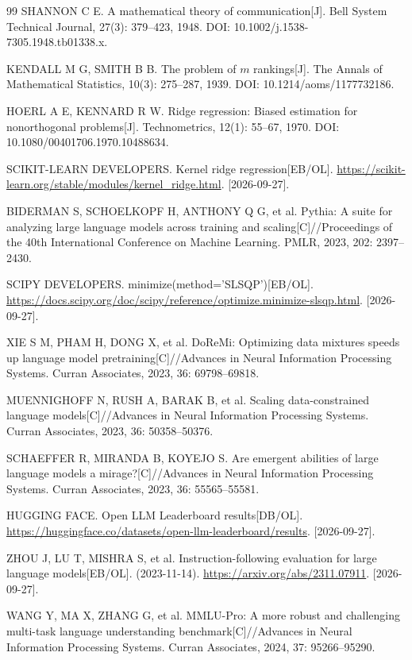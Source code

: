 \begin{thebibliography}{99}
 SHANNON C E. A mathematical theory of communication[J]. Bell System Technical Journal, 27(3): 379--423, 1948. DOI: 10.1002/j.1538-7305.1948.tb01338.x.

 KENDALL M G, SMITH B B. The problem of $m$ rankings[J]. The Annals of Mathematical Statistics, 10(3): 275--287, 1939. DOI: 10.1214/aoms/1177732186.

 HOERL A E, KENNARD R W. Ridge regression: Biased estimation for nonorthogonal problems[J]. Technometrics, 12(1): 55--67, 1970. DOI: 10.1080/00401706.1970.10488634.

 SCIKIT-LEARN DEVELOPERS. Kernel ridge regression[EB/OL]. \url{https://scikit-learn.org/stable/modules/kernel_ridge.html}. [2026-09-27].

 BIDERMAN S, SCHOELKOPF H, ANTHONY Q G, et al. Pythia: A suite for analyzing large language models across training and scaling[C]//Proceedings of the 40th International Conference on Machine Learning. PMLR, 2023, 202: 2397--2430.

 SCIPY DEVELOPERS. minimize(method='SLSQP')[EB/OL]. \url{https://docs.scipy.org/doc/scipy/reference/optimize.minimize-slsqp.html}. [2026-09-27].

 XIE S M, PHAM H, DONG X, et al. DoReMi: Optimizing data mixtures speeds up language model pretraining[C]//Advances in Neural Information Processing Systems. Curran Associates, 2023, 36: 69798--69818.

 MUENNIGHOFF N, RUSH A, BARAK B, et al. Scaling data-constrained language models[C]//Advances in Neural Information Processing Systems. Curran Associates, 2023, 36: 50358--50376.

 SCHAEFFER R, MIRANDA B, KOYEJO S. Are emergent abilities of large language models a mirage?[C]//Advances in Neural Information Processing Systems. Curran Associates, 2023, 36: 55565--55581.

 HUGGING FACE. Open LLM Leaderboard results[DB/OL]. \url{https://huggingface.co/datasets/open-llm-leaderboard/results}. [2026-09-27].

 ZHOU J, LU T, MISHRA S, et al. Instruction-following evaluation for large language models[EB/OL]. (2023-11-14). \url{https://arxiv.org/abs/2311.07911}. [2026-09-27].

 WANG Y, MA X, ZHANG G, et al. MMLU-Pro: A more robust and challenging multi-task language understanding benchmark[C]//Advances in Neural Information Processing Systems. Curran Associates, 2024, 37: 95266--95290.


\end{thebibliography}

